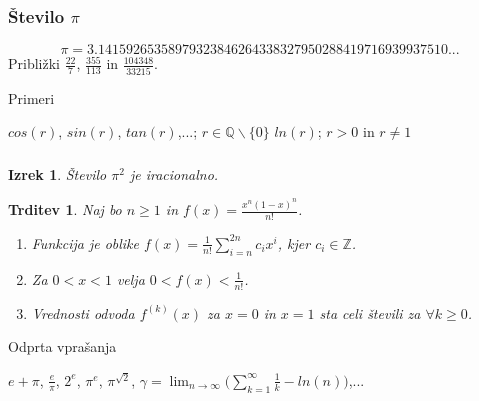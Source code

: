 \documentclass{beamer}
\newtheorem{izrek}{Izrek}
\newtheorem{trditev}{Trditev}
\newcommand{\odvod}[1]{f^{({#1})}(x)}
\begin{document}
\begin{frame}
\frametitle{Število $\pi$}

\[ \pi = 3.14159265358979323846264338327950288419716939937510... \]
\vskip 1cm
Približki $\frac{22}{7}$, $\frac{355}{113}$ in $\frac{104348}{33215}$.

\end{frame}

\begin{frame}
\begin{exampleblock}{Primeri}
\begin{center}
 $cos(r)$, $sin(r)$, $tan(r)$,...; $r \in \mathbb{Q}\backslash\{0\}$
\vskip 0.5cm
 $ln(r)$; $r>0$ in $r\ne 1$
\end{center}
\end{exampleblock}
\end{frame}

\begin{frame}
\frametitle{}

\begin{izrek}
Število $\pi^2$ je iracionalno.  
\end{izrek}

\pause
\begin{trditev}
Naj bo $n\ge1$ in $f(x)=\frac{x^n(1-x)^n}{n!}$.

\begin{enumerate}
\item Funkcija je oblike $\displaystyle f(x)=\frac{1}{n!}\sum_{i=n}^{2n}c_ix^i$, kjer $c_i\in\mathbb{Z}$.
\pause
\item Za $0<x<1$ velja $0<f(x)<\frac{1}{n!}$.
\pause
\item Vrednosti odvoda $\odvod{k}$ za $x=0$ in $x=1$ sta celi števili za $\forall k\ge0$.
\end{enumerate}

\end{trditev}

\end{frame}

\begin{frame}
\begin{exampleblock}{Odprta vprašanja}
\begin{center}
$e+\pi$, $\frac{e}{\pi}$, $2^e$, $\pi^e$, $\pi^{\sqrt{2}}$, $\displaystyle \gamma = \lim_{n\to\infty} \big( \sum_{k=1}^{\infty}\frac{1}{k}-ln(n)\big)$,...
\end{center}
\end{exampleblock}
\end{frame}
\end{document}

